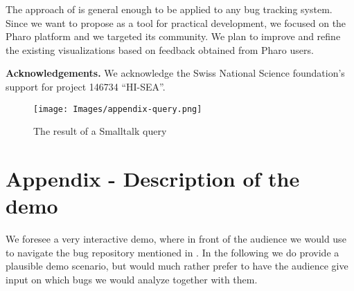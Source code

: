 The approach of \ib is general enough to be applied to any bug tracking system. Since we want to propose \ib as a tool for practical development, we focused on the Pharo platform and we targeted its community. We plan to improve \ib and refine the existing visualizations based on feedback obtained from Pharo users.  


{\bf Acknowledgements.} We acknowledge the Swiss National Science foundation's support for project 146734 ``HI-SEA''.






\begin{figure*}[ht]
\centering
\texttt{[image: Images/appendix-query.png]}
\caption{The result  of a Smalltalk query}
\label{appendix-query}
\end{figure*}

\newpage


\section*{Appendix - Description of the demo}

We foresee a very interactive demo, where in front of the audience we would use \ib to navigate the bug repository mentioned in . In the following we do provide a plausible demo scenario, but would much rather prefer to have the audience give input on which bugs we would analyze together with them.

